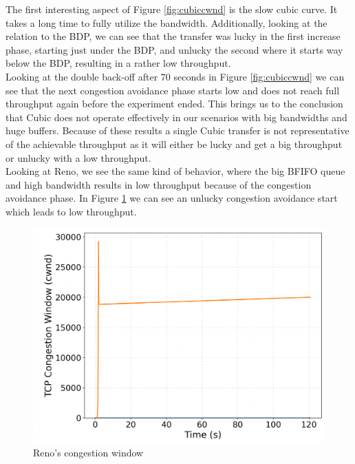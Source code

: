 \documentclass[a4paper,english, 11pt]{report}
\begin{document}
The first interesting aspect of Figure \ref{fig:cubiccwnd} is the slow cubic curve. It takes a long time to fully utilize the bandwidth. Additionally, looking at the relation to the BDP, we can see that the transfer was lucky in the first increase phase, starting just under the BDP, and unlucky the second where it starts way below the BDP, resulting in a rather low throughput.\\

Looking at the double back-off after 70 seconds in Figure \ref{fig:cubiccwnd} we can see that the next congestion avoidance phase starts low and does not reach full throughput again before the experiment ended. This brings us to the conclusion that Cubic does not operate effectively in our scenarios with big bandwidths and huge buffers. Because of these results a single Cubic transfer is not representative of the achievable throughput as it will either be lucky and get a big throughput or unlucky with a low throughput.\\

Looking at Reno, we see the same kind of behavior, where the big BFIFO queue and high bandwidth results in low throughput because of the congestion avoidance phase. In Figure \ref{fig:renocwnd} we can see an unlucky congestion avoidance start which leads to low throughput.
 
\begin{figure}[!h!] %
	\centering
	\includegraphics[scale=0.25]{../diagrams/witestlab/renocwnd.png}
  	\caption{Reno's congestion window}
  	\label{fig:renocwnd}
\end{figure}
\end{document}
